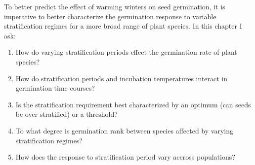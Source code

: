 \documentclass{article}\usepackage[]{graphicx}\usepackage[]{color}
\begin{document}
\indent To better predict the effect of warming winters on seed germination, it is imperative to better characterize the germination response to variable stratification regimes for a more broad range of plant species. In this chapter I ask:
\begin{enumerate}
\item How do varying stratification periods effect the germination rate of plant species? 
\item How do stratification periods and incubation temperatures interact in germination time courses?
\item Is the stratification requirement best characterized by an optimum (can seeds be over stratified) or a threshold?
\item To what degree is germination rank between species affected by varying stratification regimes?
\item How does the response to stratification period vary accross populations?
\end{enumerate}
\end{document}
